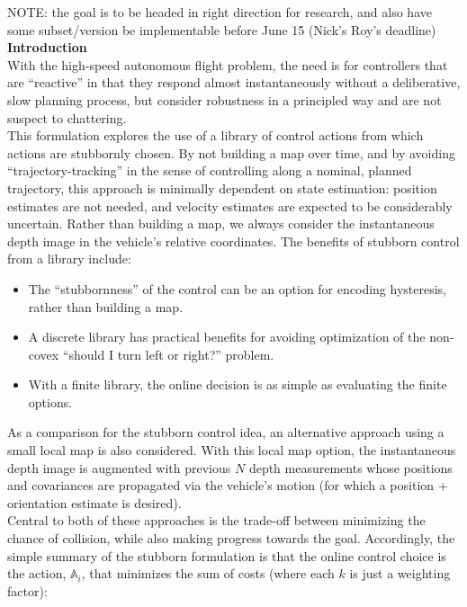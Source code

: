 \documentclass[paper=a4, fontsize=11pt]{scrartcl} %
\numberwithin{equation}{section} %
\numberwithin{figure}{section} %
\numberwithin{table}{section} %
\begin{document}
\newpage

NOTE: the goal is to be headed in right direction for research, and also have some subset/version be implementable before June 15 (Nick's Roy's deadline) \\

\textbf{Introduction}
\\

With the high-speed autonomous flight problem, the need is for controllers that are ``reactive'' in that they respond almost instantaneously without a deliberative, slow planning process, but consider robustness in a principled way and are not suspect to chattering.\\

This formulation explores the use of a library of control actions from which actions are stubbornly chosen.   By not building a map over time, and by avoiding ``trajectory-tracking'' in the sense of controlling along a nominal, planned trajectory, this approach is minimally dependent on state estimation: position estimates are not needed, and velocity estimates are expected to be considerably uncertain.  Rather than building a map, we always consider the instantaneous depth image in the vehicle's relative coordinates.  The benefits of stubborn control from a library include:
\begin{itemize}
\item The ``stubbornness'' of the control can be an option for encoding hysteresis, rather than building a map.
\item A discrete library has practical benefits for avoiding optimization of the non-covex ``should I turn left or right?'' problem.
\item With a finite library, the online decision is as simple as evaluating the finite options.
\end{itemize}

As a comparison for the stubborn control idea, an alternative approach using a small local map is also considered.  With this local map option, the instantaneous depth image is augmented with previous $N$ depth measurements whose positions and covariances are propagated via the vehicle's motion (for which a position + orientation estimate is desired).\\

Central to both of these approaches is the trade-off between minimizing the chance of collision, while also making progress towards the goal.  Accordingly, the simple summary of the stubborn formulation is that the online control choice is the action, $\mathbb{A}_i$, that minimizes the sum of costs (where each $k$ is just a weighting factor):
\end{document}
